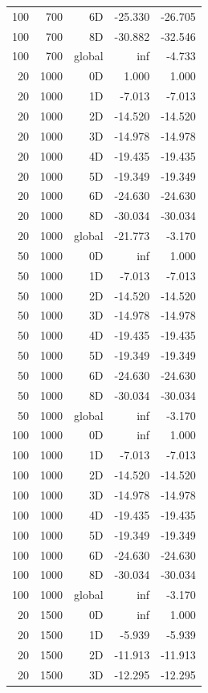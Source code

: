 \begin{longtable}{rrrrr}
100 & 700 & 6D & -25.330 & -26.705 \\
100 & 700 & 8D & -30.882 & -32.546 \\
100 & 700 & global & inf & -4.733 \\
20 & 1000 & 0D & 1.000 & 1.000 \\
20 & 1000 & 1D & -7.013 & -7.013 \\
20 & 1000 & 2D & -14.520 & -14.520 \\
20 & 1000 & 3D & -14.978 & -14.978 \\
20 & 1000 & 4D & -19.435 & -19.435 \\
20 & 1000 & 5D & -19.349 & -19.349 \\
20 & 1000 & 6D & -24.630 & -24.630 \\
20 & 1000 & 8D & -30.034 & -30.034 \\
20 & 1000 & global & -21.773 & -3.170 \\
50 & 1000 & 0D & inf & 1.000 \\
50 & 1000 & 1D & -7.013 & -7.013 \\
50 & 1000 & 2D & -14.520 & -14.520 \\
50 & 1000 & 3D & -14.978 & -14.978 \\
50 & 1000 & 4D & -19.435 & -19.435 \\
50 & 1000 & 5D & -19.349 & -19.349 \\
50 & 1000 & 6D & -24.630 & -24.630 \\
50 & 1000 & 8D & -30.034 & -30.034 \\
50 & 1000 & global & inf & -3.170 \\
100 & 1000 & 0D & inf & 1.000 \\
100 & 1000 & 1D & -7.013 & -7.013 \\
100 & 1000 & 2D & -14.520 & -14.520 \\
100 & 1000 & 3D & -14.978 & -14.978 \\
100 & 1000 & 4D & -19.435 & -19.435 \\
100 & 1000 & 5D & -19.349 & -19.349 \\
100 & 1000 & 6D & -24.630 & -24.630 \\
100 & 1000 & 8D & -30.034 & -30.034 \\
100 & 1000 & global & inf & -3.170 \\
20 & 1500 & 0D & inf & 1.000 \\
20 & 1500 & 1D & -5.939 & -5.939 \\
20 & 1500 & 2D & -11.913 & -11.913 \\
20 & 1500 & 3D & -12.295 & -12.295 \\

\end{longtable}

